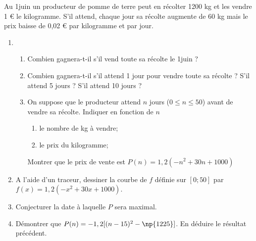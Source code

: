 
Au 1\ier juin un producteur de pomme de terre peut en récolter 1200 kg et les vendre 1 € le kilogramme. S'il attend, chaque jour sa récolte augmente de 60 kg mais le prix baisse de 0,02 € par kilogramme et par jour.
\begin{enumerate}
\item
	\begin{enumerate}
		\item Combien gagnera-t-il s'il vend toute sa récolte le 1\ier juin ?
		\item Combien gagnera-t-il s'il attend 1 jour pour vendre toute sa récolte ? S'il attend 5 jours ?	S'il attend 10 jours ?
		\item On suppose que le producteur attend $n$ jours ($0 \leq n \leq 50$) avant de vendre sa récolte. Indiquer en fonction de $n$			\begin{enumerate}
			\item le nombre de kg à vendre;
			\item le prix du kilogramme;		
		\end{enumerate}
		Montrer que le prix de vente est $P(n)=1,2(-n^2+30n+1000)$
	\end{enumerate}
\item A l'aide d'un traceur, dessiner la courbe de $f$ définie sur $[0;50]$ par $f(x)=1,2(-x^2+30x+1000)$.
\item Conjecturer la date à laquelle $P$ sera maximal.
\item Démontrer que $P(n)=-1,2[(n-15)^2-\np{1225}]$. En déduire le résultat précédent.
\end{enumerate}